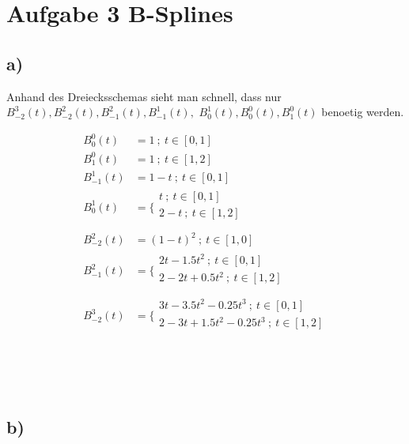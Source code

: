 

\section*{Aufgabe 3 B-Splines}

\subsection*{a)} %
\label{sub:a_}

Anhand des Dreiecksschemas sieht man schnell, dass nur $ B^{3}_{-2}(t), B^{2}_{-2}(t), B^{2}_{-1}(t), B^{1}_{-1}(t),$ $B^{1}_{0}(t) , B^{0}_{0}(t), B^{0}_{1}(t)$  benoetig werden.

\begin{align}
	B^{0}_{0}(t) &= 1 ~;~ t \in [0,1] \\
	B^{0}_{1}(t) &= 1 ~;~ t \in [1,2] \\
	B^{1}_{-1}(t) &= 1-t ~;~ t \in [0,1] \\
	B^{1}_{0}(t) &= \bigg \{ \begin{matrix}
							t ~;~ t\in [0,1]\\
							2-t ~;~ t\in [1,2]\\
	\end{matrix}\\ 
	B^{2}_{-2}(t) &= (1-t)^2 ~;~ t\in [1,0]\\
	B^{2}_{-1}(t) &= \bigg \{ \begin{matrix}
							2t-1.5t^2 ~;~ t\in [0,1]\\
							2-2t + 0.5t^2 ~;~ t\in [1,2]\\
	\end{matrix}\\
	B^{3}_{-2}(t) &= \bigg \{ \begin{matrix}
							3t-3.5t^2-0.25t^3 ~;~ t\in [0,1]\\
							2-3t+1.5t^2-0.25t^3 ~;~ t\in [1,2]\\
	\end{matrix}
\end{align}


~\vspace{25pt}

~\vspace{25pt}



\subsection*{b)} %
\label{sub:b_}

